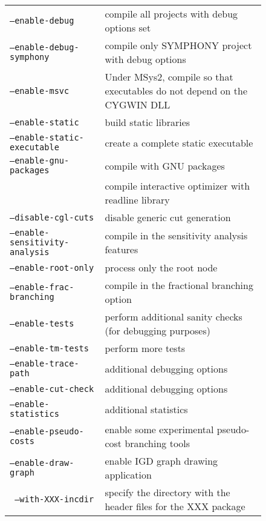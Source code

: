 \documentclass[twoside,11pt]{book}
\begin{document}
{\newpage\clearpage
{}%
\begin{figure}\begin{tabular}{ll}
\hline
\texttt{--enable-debug} & compile all projects with debug options set \\
\texttt{--enable-debug-symphony} & compile only SYMPHONY project with debug options \\
\texttt{--enable-msvc} & Under MSys2, compile so that executables do
not depend on the CYGWIN DLL \\
\texttt{--enable-static} & build static libraries \\
\texttt{--enable-static-executable} &  create a complete static executable \\
\texttt{--enable-gnu-packages} & compile with GNU packages \\
& compile interactive optimizer with readline library \\
\hline
\texttt{--disable-cgl-cuts} & disable generic cut generation \\
\texttt{--enable-sensitivity-analysis} & compile in the sensitivity analysis features \\
\texttt{--enable-root-only} & process only the root node \\
\texttt{--enable-frac-branching} & compile in the fractional branching option \\
\texttt{--enable-tests}&  perform additional sanity checks (for debugging purposes) \\
\texttt{--enable-tm-tests }& perform more tests  \\
\texttt{--enable-trace-path}&  additional debugging options \\
\texttt{--enable-cut-check}& additional debugging options \\
\texttt{--enable-statistics}& additional statistics \\
\texttt{--enable-pseudo-costs}& enable some experimental pseudo-cost branching tools \\
\texttt{--enable-draw-graph} &  enable IGD graph drawing application \\
\hline
\texttt{ --with-XXX-incdir} &  specify the directory with the header files for the XXX package \\

\end{tabular}
\end{figure}}
\end{document}
